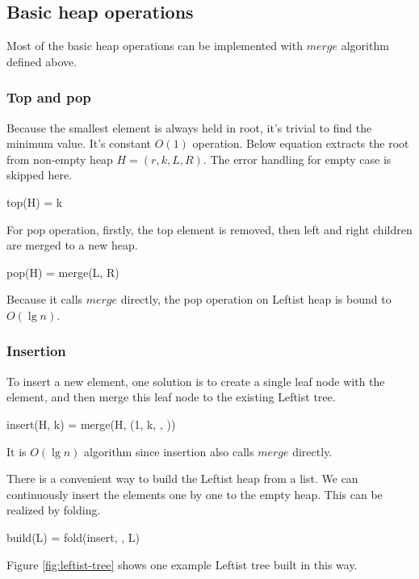 \documentclass[b5paper]{article}
\begin{document}
\subsection{Basic heap operations}

Most of the basic heap operations can be implemented with $merge$
algorithm defined above.

\subsubsection{Top and pop}
Because the smallest element is always held in root, it's trivial
to find the minimum value. It's constant $O(1)$ operation. Below
equation extracts the root from non-empty heap $H = (r, k, L, R)$.
The error handling for empty case is skipped here.

\be
top(H) = k
\ee

For pop operation, firstly, the top element is removed, then
left and right children are merged to a new heap.

\be
pop(H) = merge(L, R)
\ee

Because it calls $merge$ directly, the pop operation on Leftist heap is bound
to $O(\lg n)$.

\subsubsection{Insertion}

To insert a new element, one solution is to create a single
leaf node with the element, and then merge this leaf node to
the existing Leftist tree.

\be
insert(H, k) = merge(H, (1, k, \phi, \phi))
\ee

It is $O(\lg n)$ algorithm since insertion also calls $merge$ directly.

There is a convenient way to build the Leftist heap from
a list. We can continuously insert the elements one by one
to the empty heap. This can be realized by folding.

\be
build(L) = fold(insert, \phi, L)
\ee

Figure \ref{fig:leftist-tree} shows one example Leftist tree
built in this way.
\end{document}
